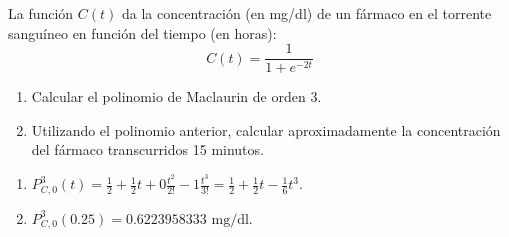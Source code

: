 {La función $C(t)$ da la concentración (en mg/dl) de un fármaco en el torrente sanguíneo en función del tiempo (en horas):
\[
C(t) = \frac{1}{{1 + e^{-2t}}}
\]
\begin{enumerate}
\item Calcular el polinomio de Maclaurin de orden 3.

\item Utilizando el polinomio anterior, calcular aproximadamente la concentración del fármaco transcurridos 15 minutos.
\end{enumerate}
}
{
\begin{enumerate}
\item $P_{C,0}^3(t)=\frac{1}{2}+\frac{1}{2}t+0\frac{t^2}{2!}-1\frac{t^3}{3!}=\frac{1}{2}+\frac{1}{2}t-\frac{1}{6}t^3$.
\item $P_{C,0}^3(0.25)= 0.6223958333 \mbox{ mg/dl}$.
\end{enumerate}
}
